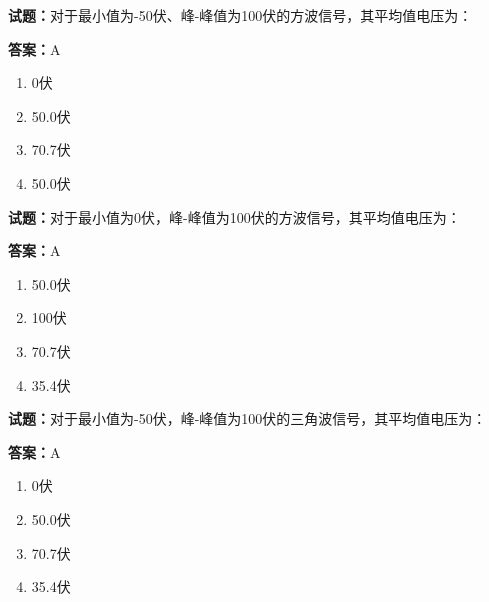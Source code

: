 \documentclass{ctexbook}
\begin{document}




\vspace{1em}

\textbf{试题：}对于最小值为-50伏、峰-峰值为100伏的方波信号，其平均值电压为： 

\textbf{答案：}A 

\begin{enumerate}[leftmargin=3em]
  \item 0伏 

  \item 50.0伏 

  \item 70.7伏 

  \item 50.0伏 

\end{enumerate}





\vspace{1em}

\textbf{试题：}对于最小值为0伏，峰-峰值为100伏的方波信号，其平均值电压为： 

\textbf{答案：}A 

\begin{enumerate}[leftmargin=3em]
  \item 50.0伏 

  \item 100伏 


  \item 70.7伏 

  \item 35.4伏 

\end{enumerate}





\vspace{1em}

\textbf{试题：}对于最小值为-50伏，峰-峰值为100伏的三角波信号，其平均值电压为： 

\textbf{答案：}A 

\begin{enumerate}[leftmargin=3em]
  \item 0伏 

  \item 50.0伏 

  \item 70.7伏 

  \item 35.4伏 

\end{enumerate}
\end{document}
